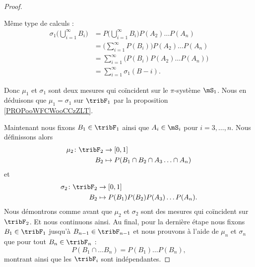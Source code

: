 \begin{proof}
\begin{subproof}
		Même type de calculs :
		\begin{subequations}
			\begin{align}
				\sigma_1\big( \bigcup_{i=1}^{\infty}B_i \big) & =P\big( \bigcup_{i=1}^{\infty}B_i \big)P(A_2)\ldots P(A_n) \\
				                                              & =\big( \sum_{i=1}^{\infty}P(B_i) \big)P(A_2)\ldots P(A_n)  \\
				                                              & =\sum_{i=1}^{\infty}\big( P(B_i)P(A_2)\ldots P(A_n) \big)  \\
				                                              & =\sum_{i=1}^{\infty}\sigma_1(B-i).
			\end{align}
		\end{subequations}
	\end{subproof}
	Donc \( \mu_1\) et \( \sigma_1\) sont deux mesures qui coïncident sur le \( \pi\)-système \( \mS_1\). Nous en déduisons que \( \mu_1=\sigma_1\) sur \( \tribF_1\) par la proposition \ref{PROPooWFCWooCCzZLT}.

	Maintenant nous fixons \( B_1\in\tribF_1\) ainsi que \( A_i\in\mS_i\) pour \( i=3,\ldots,n\). Nous définissons alors
	\begin{equation}
		\begin{aligned}
			\mu_2\colon \tribF_2 & \to \mathopen[ 0,1\mathclose]                \\
			B_2                  & \mapsto P(B_1\cap B_2\cap A_3\ldots\cap A_n)
		\end{aligned}
	\end{equation}
	et
	\begin{equation}
		\begin{aligned}
			\sigma_2\colon \tribF_2 & \to \mathopen[ 0,1\mathclose]            \\
			B_2                     & \mapsto P(B_1)P(B_2)P(A_3)\ldots P(A_n).
		\end{aligned}
	\end{equation}
	Nous démontrons comme avant que \( \mu_2\) et \( \sigma_2\) sont des mesures qui coïncident sur \( \tribF_2\). Et nous continuons ainsi. Au final, pour la dernière étape nous fixons \( B_1\in \tribF_1\) jusqu'à \( B_{n-1}\in \tribF_{n-1}\) et nous prouvons à l'aide de \( \mu_n\) et \( \sigma_n\) que pour tout \( B_n\in \tribF_n\) :
	\begin{equation}
		P(B_1\cap \dots B_n)=P(B_1)\ldots P(B_n),
	\end{equation}
	montrant ainsi que les \( \tribF_i\) sont indépendantes.
\end{proof}

